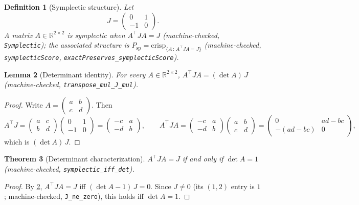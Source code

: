 \documentclass[11pt,a4paper]{article}
\newtheorem{theorem}{Theorem}[section]
\newtheorem{lemma}[theorem]{Lemma}
\newtheorem{definition}[theorem]{Definition}
\newcommand{\Real}{\mathbb{R}}
\begin{document}
\begin{definition}[Symplectic structure]
\label{def:symplectic}
Let
\[
  J = \begin{pmatrix} 0 & 1 \\ -1 & 0 \end{pmatrix}.
\]
A matrix $A \in \Real^{2 \times 2}$ is \emph{symplectic} when
$A^{\top} J A = J$
(machine-checked, \texttt{Symplectic}); the associated structure is
$P_{\mathrm{sp}} = \mathrm{crisp}_{\{A \,:\, A^{\top} J A = J\}}$
(machine-checked, \texttt{symplecticScore},
\texttt{exactPreserves\_symplecticScore}).
\end{definition}

\begin{lemma}[Determinant identity]
\label{thm:detlemma}
For every $A \in \Real^{2 \times 2}$,
$A^{\top} J A = (\det A)\, J$
(machine-checked, \texttt{transpose\_mul\_J\_mul}).
\end{lemma}
\begin{proof}
Write $A = \begin{pmatrix} a & b \\ c & d \end{pmatrix}$.
Then
\[
  A^{\top} J
  = \begin{pmatrix} a & c \\ b & d \end{pmatrix}
    \begin{pmatrix} 0 & 1 \\ -1 & 0 \end{pmatrix}
  = \begin{pmatrix} -c & a \\ -d & b \end{pmatrix},
  \qquad
  A^{\top} J A
  = \begin{pmatrix} -c & a \\ -d & b \end{pmatrix}
    \begin{pmatrix} a & b \\ c & d \end{pmatrix}
  = \begin{pmatrix} 0 & ad - bc \\ -(ad - bc) & 0 \end{pmatrix},
\]
which is $(\det A)\,J$.
\end{proof}

\begin{theorem}[Determinant characterization]
\label{thm:sympdet}
$A^{\top} J A = J$ if and only if $\det A = 1$
(machine-checked, \texttt{symplectic\_iff\_det}).
\end{theorem}
\begin{proof}
By \cref{thm:detlemma}, $A^{\top} J A = J$ iff
$(\det A - 1)\,J = 0$.
Since $J \neq 0$ (its $(1,2)$ entry is $1$;
machine-checked, \texttt{J\_ne\_zero}), this holds iff
$\det A = 1$.
\end{proof}
\end{document}

